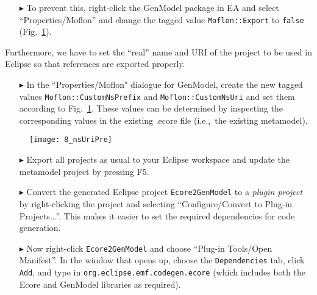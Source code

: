 \begin{enumerate}
\item[$\blacktriangleright$] To prevent this, right-click the \textsf{GenModel} package in EA and select ``Properties/Moflon'' and change the tagged value
\texttt{Moflon::Export} to \texttt{false} (Fig.~\ref{fig_customNS}).
\end{enumerate}

Furthermore, we have to set the ``real'' name and URI of the project to be used in Eclipse so that references are exported properly. 
\begin{enumerate}
\item[$\blacktriangleright$] In the ``Properties/Moflon" dialogue for \textsf{GenModel}, create the new tagged values \texttt{Moflon::CustomNsPrefix} and
\texttt{Moflon::CustomNsUri} and set them according to Fig.~\ref{fig_customNS}.
These values can be determined by inspecting the corresponding values in the existing .ecore file (i.e.,~the existing metamodel).
\end{enumerate}

\begin{figure}[htbp]
\begin{center}  \texttt{[image: 8\_nsUriPre]}
  \caption{}  
  \label{fig_customNS}
\end{center}
\end{figure}

\begin{enumerate}
\item[$\blacktriangleright$] Export all projects as usual to your Eclipse workspace and update the metamodel project by pressing \textsf{F5}.

\item[$\blacktriangleright$] Convert the generated Eclipse project \texttt{Ecore2GenModel} to a \emph{plugin project} by right-clicking the project and
selecting ``Configure/Convert to Plug-in Projects...''. This makes it easier to set the required dependencies for code generation.

\item[$\blacktriangleright$] Now right-click \texttt{Ecore2GenModel} and choose ``Plug-in Tools/Open Manifest''.
In the window that opens up, choose the \texttt{Dependencies} tab, click \texttt{Add}, and type in \texttt{org.eclipse.emf.codegen.ecore} (which includes both
the \textsf{Ecore} and \textsf{GenModel} libraries as required).
\end{enumerate}

